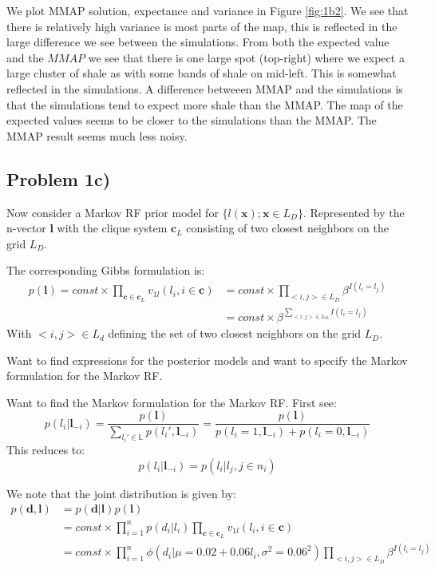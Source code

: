 \documentclass{article}
\newcommand{\vect}[1]{\ensuremath{\boldsymbol{\mathbf{#1}}}}
\begin{document}
	We plot MMAP solution, expectance and variance in Figure \ref{fig:1b2}. We see that there is relatively high variance is most parts of the map, this is reflected in the large difference we see between the simulations. From both the expected value and the $MMAP$ we see that there is one large spot (top-right) where we expect a large cluster of shale as with some bands of shale on mid-left. This is somewhat reflected in the simulations. A difference betweeen MMAP and the simulations is that the simulations tend to expect more shale than the MMAP. The map of the expected values seems to be closer to the simulations than the MMAP. The MMAP result seems much less noisy. 
	
	\pagebreak
	\subsection*{Problem 1c)}
	Now consider a Markov RF prior model for $\lbrace l(\vect x); \vect x \in L_D \rbrace$. Represented by the n-vector $\vect l$ with the clique system $\vect c_L$ consisting of two closest neighbors on the grid $L_D$. 
	
	The corresponding Gibbs formulation is:
	\begin{equation}
		\begin{split}
		p(\vect l) = const \times \prod_{\vect c \in \vect c_L} v_{1l}(l_i, i \in \vect c) &= const \times \prod_{<i, j>\in L_D} \beta^{I(l_i = l_j)} \\
		&= const \times \beta^{\sum_{<i, j>\in L_D} I(l_i = l_j)}
		\end{split}
	\end{equation}
	With $<i, j> \in L_d$ defining the set of two closest neighbors on the grid $L_D$. 
	
	Want to find expressions for the posterior models and want to specify the Markov formulation for the Markov RF. 
	
	Want to find the Markov formulation for the Markov RF. First see:  
	\begin{equation}
		p(l_i | \vect l_{-i}) = \dfrac{p(\vect l)}{\sum_{l_i' \in \mathbb{L}} p(l_i', \vect l_{-i})} = \dfrac{p(\vect l)}{p(l_i = 1, \vect l_{-i}) +p(l_i = 0, \vect l_{-i})} 
 	\end{equation}
 	This reduces to: 
 	\begin{equation}
 		p(l_i | \vect l_{-i}) = p(l_i | l_j, j \in n_i)
 	\end{equation}
	
	We note that the joint distribution is given by:
	\begin{equation}
		\begin{split}
				p(\vect d, \vect l) &= p(\vect d | \vect l)p(\vect l) 
				\\ &= const \times \prod_{i=1}^{n}p(d_i | l_i) \prod_{\vect c \in \vect c_L} v_{1l}(l_i, i \in \vect c)
				\\ &= const \times \prod_{i=1}^{n}  \phi(d_i |\mu = 0.02 + 0.06l_i, \sigma^2 = 0.06^2) \prod_{<i, j>\in L_D} \beta^{I(l_i = l_j)}
		\end{split}
	\end{equation}
	
\end{document}
